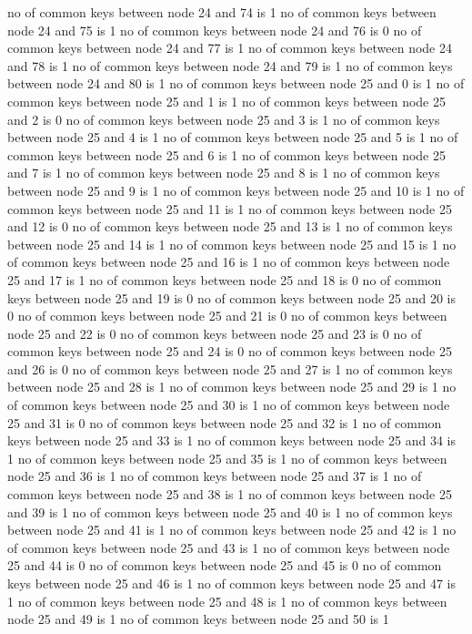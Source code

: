no of common keys between node 24 and 74 is 1
no of common keys between node 24 and 75 is 1
no of common keys between node 24 and 76 is 0
no of common keys between node 24 and 77 is 1
no of common keys between node 24 and 78 is 1
no of common keys between node 24 and 79 is 1
no of common keys between node 24 and 80 is 1
no of common keys between node 25 and 0 is 1
no of common keys between node 25 and 1 is 1
no of common keys between node 25 and 2 is 0
no of common keys between node 25 and 3 is 1
no of common keys between node 25 and 4 is 1
no of common keys between node 25 and 5 is 1
no of common keys between node 25 and 6 is 1
no of common keys between node 25 and 7 is 1
no of common keys between node 25 and 8 is 1
no of common keys between node 25 and 9 is 1
no of common keys between node 25 and 10 is 1
no of common keys between node 25 and 11 is 1
no of common keys between node 25 and 12 is 0
no of common keys between node 25 and 13 is 1
no of common keys between node 25 and 14 is 1
no of common keys between node 25 and 15 is 1
no of common keys between node 25 and 16 is 1
no of common keys between node 25 and 17 is 1
no of common keys between node 25 and 18 is 0
no of common keys between node 25 and 19 is 0
no of common keys between node 25 and 20 is 0
no of common keys between node 25 and 21 is 0
no of common keys between node 25 and 22 is 0
no of common keys between node 25 and 23 is 0
no of common keys between node 25 and 24 is 0
no of common keys between node 25 and 26 is 0
no of common keys between node 25 and 27 is 1
no of common keys between node 25 and 28 is 1
no of common keys between node 25 and 29 is 1
no of common keys between node 25 and 30 is 1
no of common keys between node 25 and 31 is 0
no of common keys between node 25 and 32 is 1
no of common keys between node 25 and 33 is 1
no of common keys between node 25 and 34 is 1
no of common keys between node 25 and 35 is 1
no of common keys between node 25 and 36 is 1
no of common keys between node 25 and 37 is 1
no of common keys between node 25 and 38 is 1
no of common keys between node 25 and 39 is 1
no of common keys between node 25 and 40 is 1
no of common keys between node 25 and 41 is 1
no of common keys between node 25 and 42 is 1
no of common keys between node 25 and 43 is 1
no of common keys between node 25 and 44 is 0
no of common keys between node 25 and 45 is 0
no of common keys between node 25 and 46 is 1
no of common keys between node 25 and 47 is 1
no of common keys between node 25 and 48 is 1
no of common keys between node 25 and 49 is 1
no of common keys between node 25 and 50 is 1
